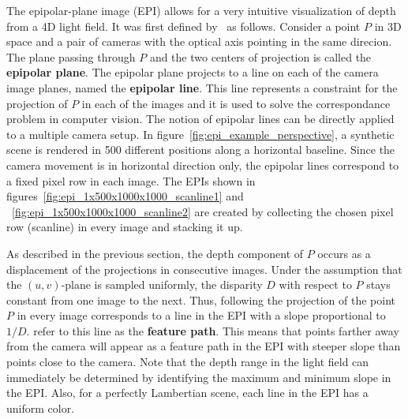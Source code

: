 The epipolar-plane image (EPI) allows for a very intuitive visualization of depth from a 4D light field.
It was first defined by~\cite{EPI} as follows.
Consider a point $P$ in 3D space and a pair of cameras with the optical axis pointing in the same direcion.
The plane passing through $P$ and the two centers of projection is called the \textbf{epipolar plane}.
The epipolar plane projects to a line on each of the camera image planes, named the \textbf{epipolar line}.
This line represents a constraint for the projection of $P$ in each of the images and it is used to solve the correspondance problem in computer vision.
The notion of epipolar lines can be directly applied to a multiple camera setup.
In figure~\ref{fig:epi_example_perspective}, a synthetic scene is rendered in 500 different positions along a horizontal baseline.
Since the camera movement is in horizontal direction only, the epipolar lines correspond to a fixed pixel row in each image.
The EPIs shown in figures~\ref{fig:epi_1x500x1000x1000_scanline1} and ~\ref{fig:epi_1x500x1000x1000_scanline2} are created by collecting the chosen pixel row (scanline) in every image and stacking it up.

As described in the previous section, the depth component of $P$ occurs as a displacement of the projections in consecutive images.
Under the assumption that the $(u, v)$-plane is sampled uniformly, the disparity $D$ with respect to $P$ stays constant from one image to the next.
Thus, following the projection of the point $P$ in every image corresponds to a line in the EPI with a slope proportional to $1 / D$.
\cite{EPI} refer to this line as the \textbf{feature path}.
This means that points farther away from the camera will appear as a feature path in the EPI with steeper slope than points close to the camera.
Note that the depth range in the light field can immediately be determined by identifying the maximum and minimum slope in the EPI.
Also, for a perfectly Lambertian scene, each line in the EPI has a uniform color.

